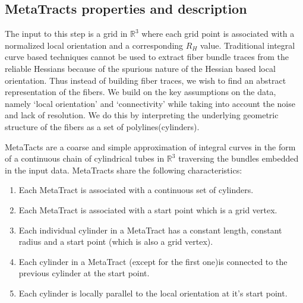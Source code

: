 \subsection {MetaTracts properties and description} 
\label{subsec:mtprop}
The input to this step is a grid in $\mathbb{R}^3$ where each grid point is associated with a normalized local orientation and a corresponding $R_H$ value.
Traditional integral curve based techniques cannot be used to extract fiber bundle traces from the reliable Hessians because of the spurious nature of the Hessian based local orientation.  Thus instead of building fiber traces, we wish to find an abstract representation of the fibers. We  build on the key assumptions on the data, namely `local orientation' and `connectivity' while taking into account the noise and lack of resolution. We do this by interpreting the underlying geometric structure of the fibers as a set of polylines(cylinders).

 MetaTacts  are a coarse and simple approximation of integral curves in the form of a continuous chain of  cylindrical tubes in $\mathbb{R}^3$ traversing the bundles embedded in the input data. MetaTracts share the following characteristics:

\begin{enumerate}
\item{Each MetaTract is associated with a continuous set of cylinders.}
\item{Each MetaTract is associated with a start point which is a grid vertex.}
\item{Each  individual cylinder in a MetaTract has a constant length,  constant radius and a start point (which is also a grid vertex).}
\item{Each cylinder in a MetaTract (except for the first one)is connected to the previous cylinder at the start point.}
\item{Each cylinder is locally parallel to the local orientation at it's start point.}
\end{enumerate}



